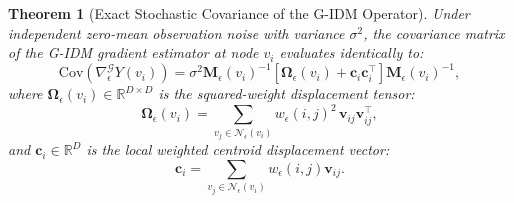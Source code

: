 \documentclass[11pt,a4paper]{article}
\newtheorem{theorem}{Theorem}
\theoremstyle{definition}
\begin{document}
\begin{theorem}[Exact Stochastic Covariance of the G-IDM Operator]
\label{thm:stochastic_covariance}
Under independent zero-mean observation noise with variance $\sigma^2$, the covariance matrix of the G-IDM gradient estimator at node $v_i$ evaluates identically to:
\begin{equation}
\text{Cov}\left( \nabla_\epsilon^{\mathcal{G}} Y(v_i) \right) = \sigma^2 \mathbf{M}_\epsilon(v_i)^{-1} \left[ \mathbf{\Omega}_\epsilon(v_i) + \mathbf{c}_i \mathbf{c}_i^\top \right] \mathbf{M}_\epsilon(v_i)^{-1},
\label{eq:stochastic_cov_exact}
\end{equation}
where $\mathbf{\Omega}_\epsilon(v_i) \in \mathbb{R}^{D \times D}$ is the squared-weight displacement tensor:
\begin{equation}
\mathbf{\Omega}_\epsilon(v_i) = \sum_{v_j \in \mathcal{N}_\epsilon(v_i)} w_\epsilon(i, j)^2 \, \mathbf{v}_{ij} \mathbf{v}_{ij}^\top,
\end{equation}
and $\mathbf{c}_i \in \mathbb{R}^D$ is the local weighted centroid displacement vector:
\begin{equation}
\mathbf{c}_i = \sum_{v_j \in \mathcal{N}_\epsilon(v_i)} w_\epsilon(i, j) \mathbf{v}_{ij}.
\end{equation}
\end{theorem}
\end{document}
